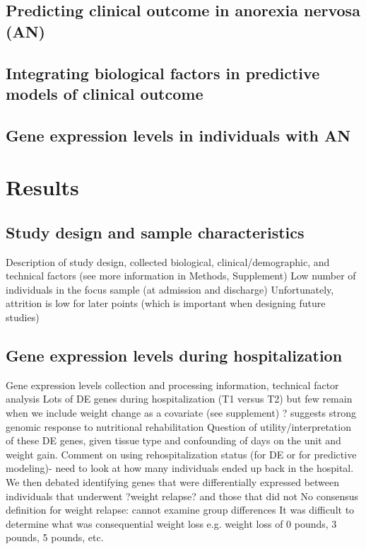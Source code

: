 \subsection{Predicting clinical outcome in anorexia nervosa (AN)}

\subsection{Integrating biological factors in predictive models of clinical outcome}

\subsection{Gene expression levels in individuals with AN}

\section{Results}\label{ch04-results}

\subsection{Study design and sample characteristics}\label{study-design-and-quality-control}

Description of study design, collected biological, clinical/demographic, and technical factors (see more information in Methods, Supplement)
Low number of individuals in the focus sample (at admission and discharge)
Unfortunately, attrition is low for later points (which is important when designing future studies)

\subsection{Gene expression levels during hospitalization}\label{batch-effects-associated-with-umi-based-single-cell-data}


Gene expression levels collection and processing information, technical factor analysis
Lots of DE genes during hospitalization (T1 versus T2) but few remain when we include weight change as a covariate (see supplement) ? suggests strong genomic response to nutritional rehabilitation
Question of utility/interpretation of these DE genes, given tissue type and confounding of days on the unit and weight gain. 
Comment on using rehospitalization status (for DE or for predictive modeling)- need to look at how many individuals ended up back in the hospital.
We then debated identifying genes that were differentially expressed between individuals that underwent ?weight relapse? and those that did not
No consensus definition for weight relapse: cannot examine group differences
It was difficult to determine what was consequential weight loss e.g. weight loss of 0 pounds, 3 pounds, 5 pounds, etc. 

